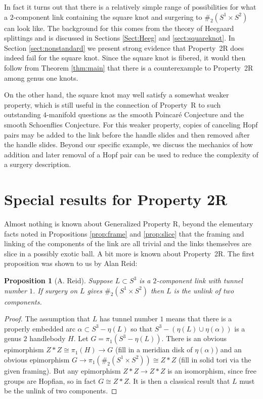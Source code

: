 \documentclass{amsart}
\newtheorem{prop}[thm]{Proposition}
\newcommand{\aaa}{\mbox{$\alpha$}}
\begin{document}
In fact it turns out that there is a relatively simple range of possibilities for what a $2$-component link containing the square knot and surgering to $\#_{2} (S^{1} \times S^{2})$ can look like.  The background for this comes from the theory of Heegaard splittings and is discussed in Sections \ref{Sect:Heeg} and \ref{sect:squareknot}.   In Section \ref{sect:nonstandard} we  present  strong evidence that Property~2R does indeed fail for the square knot.  Since the square knot is fibered, it would then follow from Theorem \ref{thm:main} that there is a counterexample to Property~2R among genus one knots.

On the other hand, the square knot may well satisfy a somewhat weaker property, which is still useful in the connection of Property~R to such outstanding $4$-manifold questions as the smooth Poincar\'e Conjecture and the smooth Schoenflies Conjecture.  For this weaker property, copies of canceling Hopf pairs may be added to the link before the handle slides and then removed after the handle slides. Beyond our specific example, we discuss the mechanics of how addition and later removal of a Hopf pair can be used to reduce the complexity of a surgery description.

\section{Special results for Property 2R}

Almost nothing is known about Generalized Property R, beyond the elementary facts noted in Propositions \ref{prop:frame} and \ref{prop:slice} that the framing and linking of the components of the link are all trivial and the links themselves are slice in a possibly exotic ball.
A bit more is known about Property~2R.  The first proposition was shown to us by Alan Reid:

\begin{prop}[A. Reid]  Suppose $L \subset S^3$ is a $2$-component link with tunnel number $1$.  If surgery on $L$ gives $\#_{2} (S^{1} \times S^{2})$ then $L$ is the unlink of two components.
\end{prop}

\begin{proof} The assumption that $L$ has tunnel number $1$ means that there is a properly embedded arc $\aaa \subset S^3 - \eta(L)$ so that  $S^3 - (\eta(L) \cup \eta(\aaa))$ is a genus $2$ handlebody $H$.  Let $G = \pi_1(S^3 - \eta(L))$.  There is an obvious epimorphism $Z*Z \cong \pi_1(H) \to G$ (fill in a meridian disk of $\eta(\aaa)$) and an obvious epimorphism $G \to \pi_1(\#_{2} (S^{1} \times S^{2})) \cong Z*Z$ (fill in solid tori via the given framing).  But any epimorphism $Z*Z \to Z*Z$ is an isomorphism, since free groups are Hopfian, so in fact $G \cong Z*Z$.  It is then a classical result that $L$ must be the unlink of two components. \end{proof}
\end{document}
